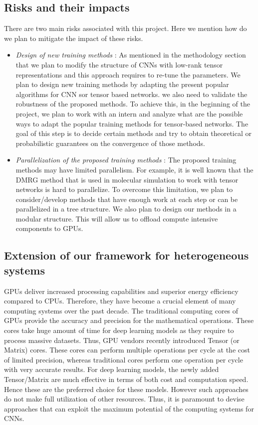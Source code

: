 \documentclass[11pt]{article}
\begin{document}
\subsection{Risks and their impacts}
There are two main risks associated with this project. Here we mention how do we plan to mitigate the impact of these risks.

\begin{itemize}
	\item \emph{Design of new training methods} : As mentioned in the methodology section that we plan to modify the structure of CNNs with low-rank tensor representations and this approach requires to re-tune the parameters. We plan to design new training methods by adapting the present popular algorithms for CNN sor tensor based networks. we also need to validate the robustness of the proposed methods. To achieve this, in the beginning of the project, we plan to work with an intern and analyze what are the possible ways to adapt the popular training methods for tensor-based networks. The goal of this step is to decide certain methods and try to obtain theoretical or probabilistic guarantees on the convergence of those methods.
	
	\item \emph{Parallelization of the proposed training methods} : The proposed training methods may have limited parallelism. For example, it is well known that the DMRG method that is used in molecular simulation to work with tensor networks is hard to parallelize. To overcome this limitation, we plan to consider/develop methods that have enough work at each step or can be parallelized in a tree structure. We also plan to design our methods in a modular structure. This will allow us to offload compute intensive components to GPUs.        
\end{itemize}

\subsection{Extension of our framework for heterogeneous systems}
GPUs deliver increased processing capabilities and superior energy efficiency compared to CPUs. Therefore, they have become a crucial element of many computing systems over the past decade. The traditional computing cores of GPUs provide the accuracy and precision for the mathematical operations. These cores take huge amount of time for deep learning models as they require to process massive datasets. Thus, GPU vendors recently introduced Tensor (or Matrix) cores. These cores can perform multiple operations per cycle at the cost of limited precision, whereas traditional cores perform one operation per cycle with very accurate results. For deep learning models, the newly added Tensor/Matrix are much effective in terms of both cost and computation speed. Hence these are the preferred choice for these models. However such approaches do not make full utilization of other resources. Thus, it is paramount to devise approaches that can exploit the maximum potential of the computing systems for CNNs.
\end{document}
